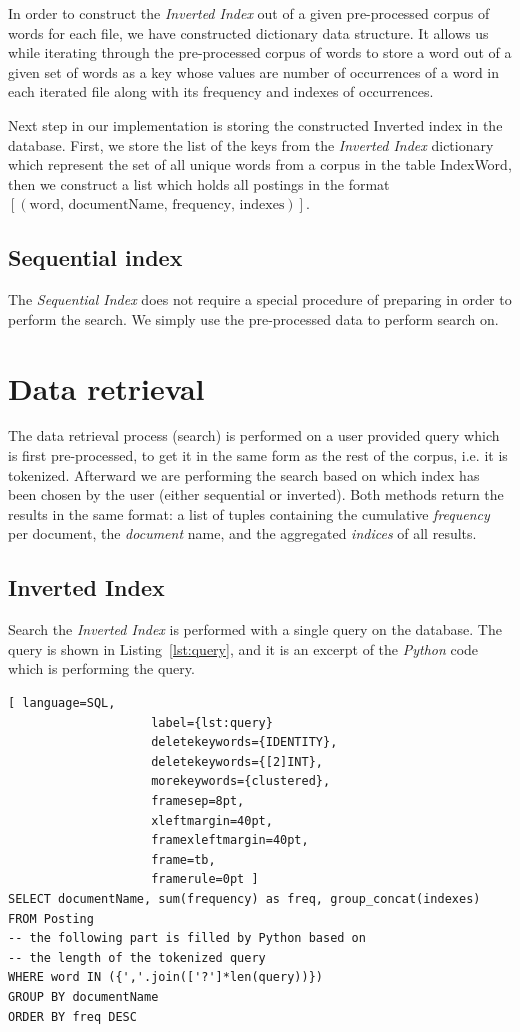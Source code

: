 \documentclass{article}
\begin{document}
In order to construct the \textit{Inverted Index} out of a given pre-processed corpus of words for each file, we have constructed dictionary data structure. It allows us while iterating through the pre-processed corpus of words to store a word out of a given set of words as a key whose values are number of occurrences of a word in each iterated file along with its frequency and indexes of occurrences.

Next step in our implementation is storing the constructed Inverted index in the database. First, we store the list of the keys from the \textit{Inverted Index} dictionary which represent the set of all unique words from a corpus in the table IndexWord, then we construct a list which holds all postings in the format \newline \texttt{$[(\mbox{word, documentName, frequency, indexes})]$}.


\subsection{Sequential index}

The \textit{Sequential Index} does not require a special procedure of preparing in order to perform the search. We simply use the pre-processed data to perform search on.

\section{Data retrieval}
The data retrieval process (search) is performed on a user provided query which is first pre-processed, to get it in the same form as the rest of the corpus, i.e. it is tokenized. Afterward we are performing the search based on which index has been chosen by the user (either sequential or inverted). Both methods return the results in the same format: a list of tuples containing the cumulative \textit{frequency} per document, the \textit{document} name, and the aggregated \textit{indices} of all results.

\subsection{Inverted Index}
Search the \textit{Inverted Index} is performed with a single query on the database. The query is shown in Listing~\ref{lst:query}, and it is an excerpt of the \textit{Python} code which is performing the query.

\begin{lstlisting}[ language=SQL,
                    label={lst:query}
                    deletekeywords={IDENTITY},
                    deletekeywords={[2]INT},
                    morekeywords={clustered},
                    framesep=8pt,
                    xleftmargin=40pt,
                    framexleftmargin=40pt,
                    frame=tb,
                    framerule=0pt ]
SELECT documentName, sum(frequency) as freq, group_concat(indexes)
FROM Posting
-- the following part is filled by Python based on
-- the length of the tokenized query
WHERE word IN ({','.join(['?']*len(query))})
GROUP BY documentName
ORDER BY freq DESC
\end{lstlisting}
\end{document}
